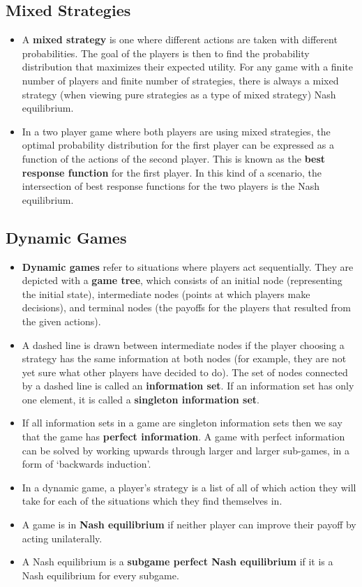 \documentclass[a4paper]{article}
\begin{document}
\subsection{Mixed Strategies}
\begin{itemize}
    \item A \textbf{mixed strategy} is one where different actions are taken with different probabilities. The goal of the players is then to find the probability distribution that maximizes their expected utility. For any game with a finite number of players and finite number of strategies, there is always a mixed strategy (when viewing pure strategies as a type of mixed strategy) Nash equilibrium.
    \item In a two player game where both players are using mixed strategies, the optimal probability distribution for the first player can be expressed as a function of the actions of the second player. This is known as the \textbf{best response function} for the first player. In this kind of a scenario, the intersection of best response functions for the two players is the Nash equilibrium.
\end{itemize}

\subsection{Dynamic Games}
\begin{itemize}
    \item \textbf{Dynamic games} refer to situations where players act sequentially. They are depicted with a \textbf{game tree}, which consists of an initial node (representing the initial state), intermediate nodes (points at which players make decisions), and terminal nodes (the payoffs for the players that resulted from the given actions).
    \item A dashed line is drawn between intermediate nodes if the player choosing a strategy has the same information at both nodes (for example, they are not yet sure what other players have decided to do). The set of nodes connected by a dashed line is called an \textbf{information set}. If an information set has only one element, it is called a \textbf{singleton information set}. 
    \item If all information sets in a game are singleton information sets then we say that the game has \textbf{perfect information}. A game with perfect information can be solved by working upwards through larger and larger sub-games, in a form of `backwards induction'.
    \item In a dynamic game, a player's strategy is a list of all of which action they will take for each of the situations which they find themselves in. 
    \item A game is in \textbf{Nash equilibrium} if neither player can improve their payoff by acting unilaterally. 
    \item A Nash equilibrium is a \textbf{subgame perfect Nash equilibrium} if it is a Nash equilibrium for every subgame.
\end{itemize}
\end{document}
